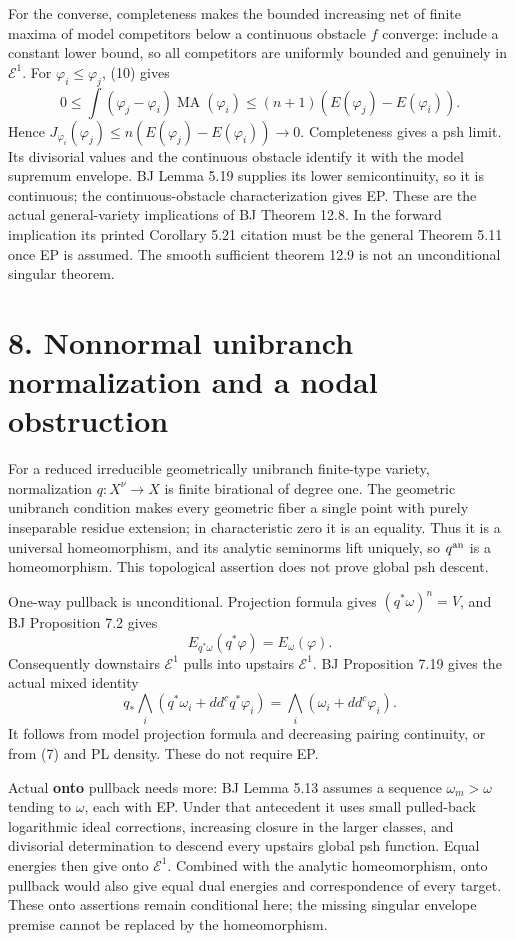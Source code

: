 \documentclass[
  11pt,
]{article}
\begin{document}
For the converse, completeness makes the bounded increasing net of
finite maxima of model competitors below a continuous obstacle \(f\)
converge: include a constant lower bound, so all competitors are
uniformly bounded and genuinely in \(\mathcal E^1\). For
\(\varphi_i\leq\varphi_j\), (10) gives
\[0\leq\int(\varphi_j-\varphi_i)\operatorname{MA}(\varphi_i)
 \leq(n+1)(E(\varphi_j)-E(\varphi_i)).\] Hence
\(J_{\varphi_i}(\varphi_j)\leq n(E(\varphi_j)-E(\varphi_i))\to0\).
Completeness gives a psh limit. Its divisorial values and the continuous
obstacle identify it with the model supremum envelope. BJ Lemma 5.19
supplies its lower semicontinuity, so it is continuous; the
continuous-obstacle characterization gives EP. These are the actual
general-variety implications of BJ Theorem 12.8. In the forward
implication its printed Corollary 5.21 citation must be the general
Theorem 5.11 once EP is assumed. The smooth sufficient theorem 12.9 is
not an unconditional singular theorem.

\section{8. Nonnormal unibranch normalization and a nodal
obstruction}\label{nonnormal-unibranch-normalization-and-a-nodal-obstruction}

For a reduced irreducible geometrically unibranch finite-type variety,
normalization \(q:X^\nu\to X\) is finite birational of degree one. The
geometric unibranch condition makes every geometric fiber a single point
with purely inseparable residue extension; in characteristic zero it is
an equality. Thus it is a universal homeomorphism, and its analytic
seminorms lift uniquely, so \(q^{\rm an}\) is a homeomorphism. This
topological assertion does not prove global psh descent.

One-way pullback is unconditional. Projection formula gives
\((q^*\omega)^n=V\), and BJ Proposition 7.2 gives
\[E_{q^*\omega}(q^*\varphi)=E_\omega(\varphi).\] Consequently downstairs
\(\mathcal E^1\) pulls into upstairs \(\mathcal E^1\). BJ Proposition
7.19 gives the actual mixed identity
\[q_*\bigwedge_i(q^*\omega_i+dd^cq^*\varphi_i)
       =\bigwedge_i(\omega_i+dd^c\varphi_i).\tag{20}\] It follows from
model projection formula and decreasing pairing continuity, or from (7)
and PL density. These do not require EP.

Actual \textbf{onto} pullback needs more: BJ Lemma 5.13 assumes a
sequence \(\omega_m>\omega\) tending to \(\omega\), each with EP. Under
that antecedent it uses small pulled-back logarithmic ideal corrections,
increasing closure in the larger classes, and divisorial determination
to descend every upstairs global psh function. Equal energies then give
onto \(\mathcal E^1\). Combined with the analytic homeomorphism, onto
pullback would also give equal dual energies and correspondence of every
target. These onto assertions remain conditional here; the missing
singular envelope premise cannot be replaced by the homeomorphism.
\end{document}

